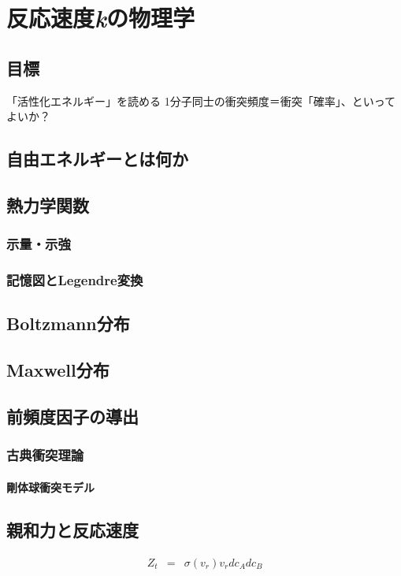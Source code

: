 \chapter{反応速度{\it k}の物理学}
\section{目標}
「活性化エネルギー」を読める
1分子同士の衝突頻度＝衝突「確率」、といってよいか？

\section{自由エネルギーとは何か}
\section{熱力学関数}
\subsection{示量・示強}
\subsection{記憶図とLegendre変換}
\section{Boltzmann分布}
\section{Maxwell分布}
\section{前頻度因子の導出}
\subsection{古典衝突理論}
\subsubsection{剛体球衝突モデル}
\section{親和力と反応速度}

\begin{eqnarray*}
Z_t & = & \sigma (v_r) v_r dc_A dc_B\\
\end{eqnarray*}

